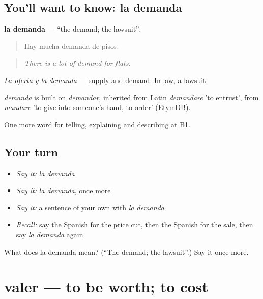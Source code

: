 \subsection*{You'll want to know: la demanda}
\textbf{la demanda} — \textquotedblleft{}the demand; the lawsuit\textquotedblright{}.

\begin{quote}
Hay mucha demanda de pisos.
\end{quote}

\begin{quote}
\emph{There is a lot of demand for flats.}
\end{quote}

\emph{La oferta y la demanda} — supply and demand. In law, a lawsuit.

\begin{cousinweb}
\emph{demanda} is built on \emph{demandar}, inherited from Latin \emph{demandare} 'to entrust', from \emph{mandare} 'to give into someone's hand, to order' (EtymDB).
\end{cousinweb}

\begin{grammarlens}[title={What you've built}]
One more word for telling, explaining and describing at B1.
\end{grammarlens}

\subsection*{Your turn}
\begin{itemize}
\raggedright
  \item \emph{Say it:} \emph{la demanda}
  \item \emph{Say it:} \emph{la demanda}, once more
  \item \emph{Say it:} a sentence of your own with \emph{la demanda}
  \item \emph{Recall:} say the Spanish for the price cut, then the Spanish for the sale, then say \emph{la demanda} again
\end{itemize}

\begin{tcolorbox}[breakable,colback=teal!4,colframe=teal!35!black,title={Before you move on}]
What does la demanda mean? (\textquotedblleft{}The demand; the lawsuit\textquotedblright{}.) Say it once more.
\end{tcolorbox}
\section[valer]{valer — to be worth; to cost}


